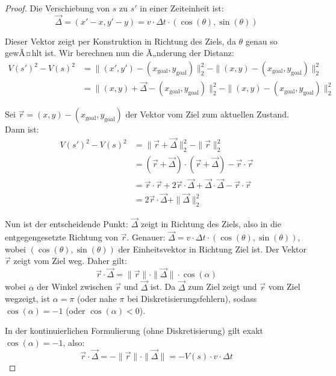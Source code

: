 ﻿\documentclass[a4paper,12pt]{article}
\theoremstyle{definition}
\begin{document}
\begin{proof}
Die Verschiebung von $s$ zu $s'$ in einer Zeiteinheit ist:
\begin{equation}
\vec{\Delta} = (x' - x, y' - y) = v \cdot \Delta t \cdot (\cos(\theta), \sin(\theta))
\end{equation}

Dieser Vektor zeigt per Konstruktion in Richtung des Ziels, da $\theta$ genau so gewÃ¤hlt ist. Wir berechnen nun die Ã„nderung der Distanz:
\begin{align}
V(s')^2 - V(s)^2 &= \|(x', y') - (x_{\text{goal}}, y_{\text{goal}})\|_2^2 - \|(x, y) - (x_{\text{goal}}, y_{\text{goal}})\|_2^2 \\
&= \|(x, y) + \vec{\Delta} - (x_{\text{goal}}, y_{\text{goal}})\|_2^2 - \|(x, y) - (x_{\text{goal}}, y_{\text{goal}})\|_2^2
\end{align}

Sei $\vec{r} = (x, y) - (x_{\text{goal}}, y_{\text{goal}})$ der Vektor vom Ziel zum aktuellen Zustand. Dann ist:
\begin{align}
V(s')^2 - V(s)^2 &= \|\vec{r} + \vec{\Delta}\|_2^2 - \|\vec{r}\|_2^2 \\
&= (\vec{r} + \vec{\Delta}) \cdot (\vec{r} + \vec{\Delta}) - \vec{r} \cdot \vec{r} \\
&= \vec{r} \cdot \vec{r} + 2 \vec{r} \cdot \vec{\Delta} + \vec{\Delta} \cdot \vec{\Delta} - \vec{r} \cdot \vec{r} \\
&= 2 \vec{r} \cdot \vec{\Delta} + \|\vec{\Delta}\|_2^2
\end{align}

Nun ist der entscheidende Punkt: $\vec{\Delta}$ zeigt in Richtung des Ziels, also in die entgegengesetzte Richtung von $\vec{r}$. Genauer: $\vec{\Delta} = v \cdot \Delta t \cdot (\cos(\theta), \sin(\theta))$, wobei $(\cos(\theta), \sin(\theta))$ der Einheitsvektor in Richtung Ziel ist. Der Vektor $\vec{r}$ zeigt vom Ziel weg. Daher gilt:
\begin{equation}
\vec{r} \cdot \vec{\Delta} = \|\vec{r}\| \cdot \|\vec{\Delta}\| \cdot \cos(\alpha)
\end{equation}
wobei $\alpha$ der Winkel zwischen $\vec{r}$ und $\vec{\Delta}$ ist. Da $\vec{\Delta}$ zum Ziel zeigt und $\vec{r}$ vom Ziel wegzeigt, ist $\alpha = \pi$ (oder nahe $\pi$ bei Diskretisierungsfehlern), sodass $\cos(\alpha) = -1$ (oder $\cos(\alpha) < 0$).

In der kontinuierlichen Formulierung (ohne Diskretisierung) gilt exakt $\cos(\alpha) = -1$, also:
\begin{equation}
\vec{r} \cdot \vec{\Delta} = -\|\vec{r}\| \cdot \|\vec{\Delta}\| = -V(s) \cdot v \cdot \Delta t
\end{equation}


\end{proof}
\end{document}
